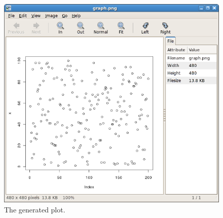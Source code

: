 \documentclass[a4paper]{book}
\begin{document}
\begin{figure}[ht]
	\centering
	\includegraphics[width=\textwidth]{images/standalone-output.png}
	\caption{The generated plot.}
	\label{standalone-output}
\end{figure}

\clearpage
\end{document}
